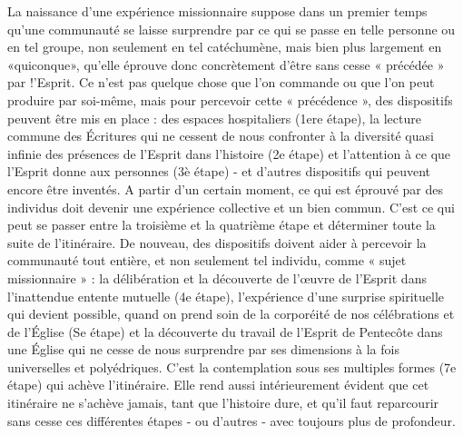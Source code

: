 \begin{singlequote}
   
  La naissance d'une expérience missionnaire suppose dans un premier temps qu'une communauté se laisse surprendre par ce qui se passe en telle personne ou en tel groupe, non seulement en tel catéchumène, mais bien plus largement en «quiconque», qu'elle éprouve donc concrètement d'être sans cesse « précédée » par !'Esprit. Ce n'est pas quelque chose que l'on commande ou que l'on peut produire par soi-même, mais pour percevoir cette « précédence », des dispositifs peuvent être mis en place : des espaces hospitaliers (1ere étape), la lecture commune des Écritures qui ne cessent de nous confronter à la diversité quasi infinie des présences de l'Esprit dans l'histoire (2e étape) et l'attention à ce que l'Esprit donne aux personnes (3è étape) - et d'autres dispositifs qui peuvent encore être inventés. A partir d'un certain moment, ce qui est éprouvé par des individus doit devenir une expérience collective et un bien commun. C'est ce qui peut se passer entre la troisième et la quatrième étape et  
déterminer toute la suite de l'itinéraire. De nouveau, des dispositifs doivent aider à percevoir la communauté tout entière, et non seulement tel individu, comme « sujet missionnaire » : la délibération et la découverte de l'œuvre de l'Esprit dans l'inattendue entente mutuelle (4e étape), l'expérience d'une surprise spirituelle qui devient possible, quand on prend soin de la corporéité de nos célébrations et de l'Église (Se étape) et la découverte du travail de l'Esprit de Pentecôte dans une Église qui ne cesse de nous surprendre par ses dimensions à la fois universelles et polyédriques. C'est la contemplation sous ses multiples formes (7e étape) qui achève l'itinéraire. Elle rend aussi intérieurement évident que cet itinéraire ne s'achève jamais, tant que l'histoire dure, et qu'il faut reparcourir sans cesse ces différentes étapes - ou d'autres - avec toujours plus de profondeur.\cite[p. 460]{theobald_urgences_2017}

 \end{singlequote}
 



\begin{comment}
    \begin{enumerate}
    \item la genèse d'Eglise dans un \textit{espace hospitalier}
    \item la relation à l'écriture sainte
    \item la découverte de personnes nouvelles et de leurs charismes
    \item une communauté qui se met à délibérer
    \item la perception des dimensions corporelles de la Foi
    \item la prise en compte de la dimension toujours plus universelle de l'Eglise

    \item contemplation
\end{enumerate}
regard sur le chemin parcouru
\end{comment}
 

